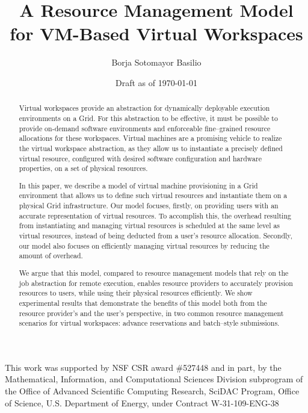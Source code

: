 \documentclass[singlespace]{ccw_chithesis}
\begin{document}
\title{A Resource Management Model for VM-Based Virtual Workspaces}
\author{Borja Sotomayor Basilio}
\date{Draft as of \today}
\maketitle



\begin{abstract}
Virtual workspaces provide an abstraction for dynamically deployable execution environments on a Grid. For this abstraction to be effective, it must be possible to provide on-demand software environments and enforceable fine--grained resource allocations for these workspaces. Virtual machines are a promising vehicle to realize the virtual workspace abstraction, as they allow us to instantiate a precisely defined virtual resource, configured with desired software configuration and hardware properties, on a set of physical resources.

In this paper, we describe a model of virtual machine provisioning in a Grid environment that allows us to define such virtual resources and instantiate them on a physical Grid infrastructure. Our model focuses, firstly, on providing users with an accurate representation of virtual resources. To accomplish this, the overhead resulting from instantiating and managing virtual resources is scheduled at the same level as virtual resources, instead of being deducted from a user's resource allocation. Secondly, our model also focuses on efficiently managing virtual resources by reducing the amount of overhead.

We argue that this model, compared to resource management models that rely on the job abstraction for remote execution, enables resource providers to accurately provision resources to users, while using their physical resources efficiently. We show experimental results that demonstrate the benefits of this model both from the resource provider's and the user's perspective, in two common resource management scenarios for virtual workspaces: advance reservations and batch--style submissions.
\end{abstract}

\acknowledgments
This work was supported by NSF CSR award \#527448 and in part, by the
Mathematical, Information, and Computational Sciences Division
subprogram of the Office of Advanced Scientific Computing Research,
SciDAC Program, Office of Science, U.S. Department of Energy, under
Contract W{}-31{}-109{}-ENG{}-38
\end{document}
